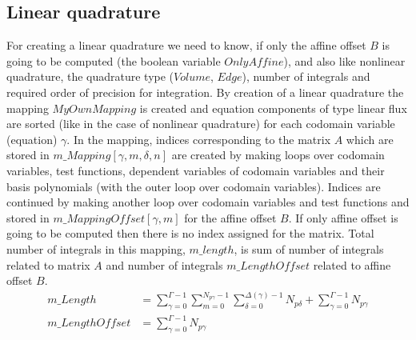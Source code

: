\documentclass[BoSSSForSolvingConservationLaws.tex]{subfiles}
\begin{document}
\subsection{Linear quadrature}
For creating a linear quadrature we need to know, if only the affine offset $B$ is going to be computed (the boolean variable $OnlyAffine$), and also like nonlinear quadrature, the quadrature type ($Volume$, $Edge$), number of integrals and required order of precision for integration. By creation of a linear quadrature the mapping $MyOwnMapping$ is created and equation components of type linear flux are sorted (like in the case of nonlinear quadrature) for each codomain variable (equation) $\gamma$. In the mapping, indices corresponding to the matrix $A$ which are stored in $m\_Mapping[\gamma,m,\delta,n]$ are created by making loops over codomain variables, test functions, dependent variables of codomain variables and their basis polynomials (with the outer loop over codomain variables). Indices are continued by making another loop over codomain variables and test functions and stored in $m\_MappingOffset[\gamma,m]$ for the affine offset $B$. If only affine offset is going to be computed then there is no index assigned for the matrix. Total number of integrals in this mapping, $m\_length$, is sum of number of integrals related to matrix $A$ and number of integrals $m\_LengthOffset$ related to affine offset $B$.
\begin{align*}
m\_Length&=\sum_{\gamma=0}^{\Gamma-1}\sum_{m=0}^{N_{p\gamma}-1}\sum_{\delta=0}^{\Delta(\gamma)-1}N_{p\delta}+\sum_{\gamma=0}^{\Gamma-1}N_{p\gamma}\\
m\_LengthOffset&=\sum_{\gamma=0}^{\Gamma-1}N_{p\gamma}
\end{align*}
\end{document}
